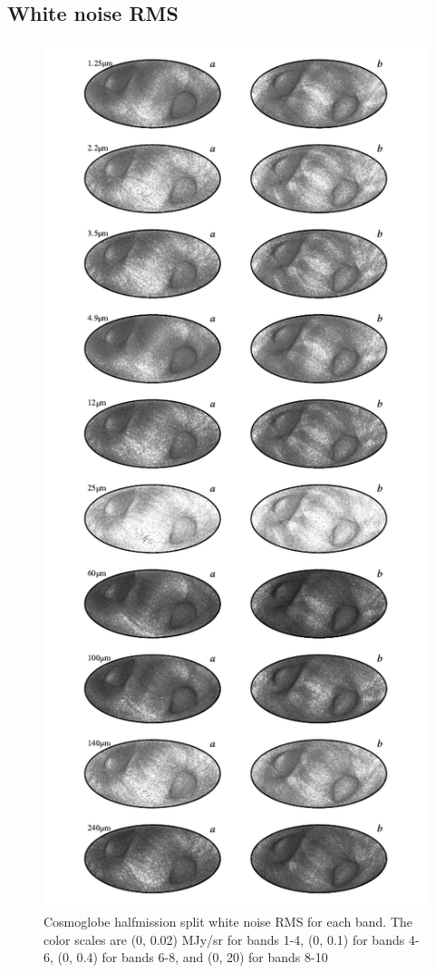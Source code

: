 \documentclass{aa}
\begin{document}
\subsection{White noise RMS}
\begin{figure}
	\centering
	\includegraphics[width=\textwidth,height=\textheight - 20pt,keepaspectratio]{figs/rms_halfmission_c0001_000019.pdf}
	\caption{Cosmoglobe halfmission split white noise RMS for each band. The color scales are (0, 0.02) MJy/sr for bands 1-4, (0, 0.1) for bands 4-6, (0, 0.4) for bands 6-8, and (0, 20) for bands 8-10}
	\label{fig:rms}
\end{figure}
\end{document}

